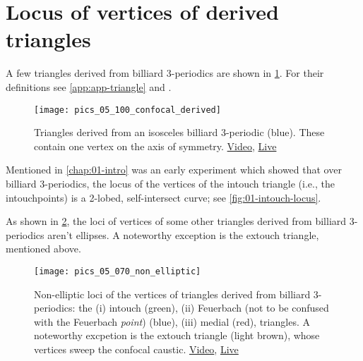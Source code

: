 \section{Locus of vertices of derived triangles}

A few triangles derived from billiard 3-periodics are shown in \cref{fig:05-derived-isosceles}. For their definitions see \cref{app:app-triangle} and \cite{mw}.

\begin{figure}
    \centering
    \texttt{[image: pics\_05\_100\_confocal\_derived]}
    \caption{Triangles derived from an isosceles billiard 3-periodic (blue). These contain one vertex on the axis of symmetry. \href{https://youtu.be/xyroRTEVNDc}{Video}, \href{https://bit.ly/3fyylD0}{Live}}
    \label{fig:05-derived-isosceles}
\end{figure}

Mentioned in \cref{chap:01-intro} was an early experiment which showed that over billiard 3-periodics, the locus of the vertices of the intouch triangle (i.e., the intouchpoints) is a 2-lobed, self-intersect curve; see \cref{fig:01-intouch-locus}.

As shown in \cref{fig:05-locus-x11-x100}, the loci of vertices of some other triangles derived from billiard 3-periodics aren't ellipses. A noteworthy exception is the extouch triangle, mentioned above.

\begin{figure}
    \centering
    \texttt{[image: pics\_05\_070\_non\_elliptic]}
    \caption{Non-elliptic loci of the vertices of triangles derived from billiard 3-periodics: the (i) intouch (green), (ii) Feuerbach (not to be confused with the Feuerbach {\em point}) (blue), (iii) medial (red), triangles. A noteworthy excpetion is the extouch triangle (light brown), whose vertices sweep the confocal caustic.
     \href{https://youtu.be/OGvCQbYqJyI}{Video}, \href{https://bit.ly/3orrSxQ}{Live}}
    \label{fig:05-locus-x11-x100}
\end{figure}
